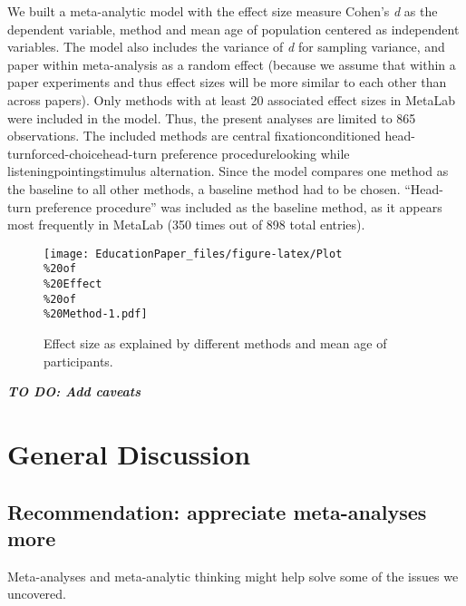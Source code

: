 \documentclass[english,floatsintext,man]{apa6}
\begin{document}
We built a meta-analytic model with the effect size measure Cohen's
\emph{d} as the dependent variable, method and mean age of population
centered as independent variables. The model also includes the variance
of \emph{d} for sampling variance, and paper within meta-analysis as a
random effect (because we assume that within a paper experiments and
thus effect sizes will be more similar to each other than across
papers). Only methods with at least 20 associated effect sizes in
MetaLab were included in the model. Thus, the present analyses are
limited to 865 observations. The included methods are central
fixationconditioned head-turnforced-choicehead-turn preference
procedurelooking while listeningpointingstimulus alternation. Since the
model compares one method as the baseline to all other methods, a
baseline method had to be chosen. \enquote{Head-turn preference
procedure} was included as the baseline method, as it appears most
frequently in MetaLab (350 times out of 898 total entries).

\begin{figure}[htbp]
\centering
\texttt{[image: EducationPaper\_files/figure-latex/Plot\\\%20of\\\%20Effect\\\%20of\\\%20Method-1.pdf]}
\caption{Effect size as explained by different methods and mean age of
participants.}
\end{figure}

\textbf{\emph{TO DO: Add caveats}}

\section{General Discussion}\label{general-discussion}

\subsection{Recommendation: appreciate meta-analyses
more}\label{recommendation-appreciate-meta-analyses-more}

Meta-analyses and meta-analytic thinking might help solve some of the
issues we uncovered.
\end{document}
